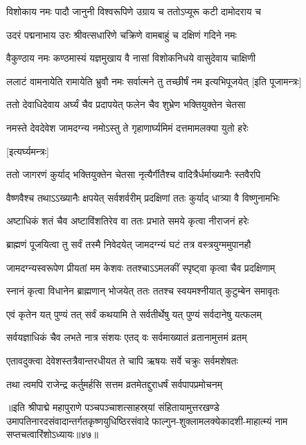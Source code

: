 \twolineshloka
{विशोकाय नमः पादौ जानुनी विश्वरूपिणे}
{उग्राय च ततोऽप्यूरू कटी दामोदराय च}%

\twolineshloka
{उदरं पद्मनाभाय उरः श्रीवत्सधारिणे}
{चक्रिणे वामबाहुं च दक्षिणं गदिने नमः}%

\twolineshloka
{वैकुण्ठाय नमः कण्ठमास्यं यज्ञमुखाय वै}
{नासां विशोकनिधये वासुदेवाय चाक्षिणी}%

\twolineshloka
{ललाटं वामनायेति रामायेति भ्रुवौ नमः}
{सर्वात्मने तु तच्छीर्षं नम इत्यभिपूजयेत्}%
[इति पूजामन्त्रः]

\twolineshloka
{ततो देवाधिदेवाय अर्घ्यं चैव प्रदापयेत्}
{फलेन चैव शुभ्रेण भक्तियुक्तेन चेतसा}%

\twolineshloka
{नमस्ते देवदेवेश जामदग्न्य नमोऽस्तु ते}
{गृहाणार्घ्यमिमं दत्तमामलक्या युतो हरेः}

[इत्यर्घ्यमन्त्रः]

\twolineshloka
{ततो जागरणं कुर्याद् भक्तियुक्तेन चेतसा}
{नृत्यैर्गीतैश्च वादित्रैर्धर्माख्यानैः स्तवैरपि}%

\twolineshloka
{वैष्णवैश्च तथाऽऽख्यानैः क्षपयेत् सर्वशर्वरीम्}
{प्रदक्षिणां ततः कुर्याद् धात्र्या वै विष्णुनामभिः}%

\twolineshloka
{अष्टाधिकं शतं चैव अष्टाविंशतिरेव वा}
{ततः प्रभाते समये कृत्वा नीराजनं हरेः}%

\twolineshloka
{ब्राह्मणं पूजयित्वा तु सर्वं तस्मै निवेदयेत्}
{जामदग्न्यं घटं तत्र वस्त्रयुग्ममुपानहौ}%

\twolineshloka
{जामदग्न्यस्वरूपेण प्रीयतां मम केशवः}
{ततश्चाऽऽमलकीं स्पृष्ट्वा कृत्वा चैव प्रदक्षिणाम्}%

\twolineshloka
{स्नानं कृत्वा विधानेन ब्राह्मणान् भोजयेत् ततः}
{ततश्च स्वयमश्नीयात् कुटुम्बेन समावृतः}%

\twolineshloka
{एवं कृतेन यत् पुण्यं तत् सर्वं कथयामि ते}
{सर्वतीर्थेषु यत् पुण्यं सर्वदानेषु यत्फलम्}%

\twolineshloka
{सर्वयज्ञाधिकं चैव लभते नात्र संशयः}
{एतद् वः सर्वमाख्यातं व्रतानामुत्तमं व्रतम्}%

\twolineshloka
{एतावदुक्त्वा देवेशस्तत्रैवान्तरधीयत}
{ते चापि ऋषयः सर्वे चक्रुः सर्वमशेषतः}%

\twolineshloka
{तथा त्वमपि राजेन्द्र कर्तुमर्हसि सत्तम}
{व्रतमेतद्दुराधर्षं सर्वपापप्रमोचनम्}%

॥इति श्रीपाद्मे महापुराणे पञ्चपञ्चाशत्साहस्र्यां संहितायामुत्तरखण्डे उमापतिनारदसंवादान्तर्गतकृष्णयुधिष्ठिरसंवादे फाल्गुन-शुक्लामलक्येकादशी-माहात्म्यं नाम सप्तचत्वारिंशोऽध्यायः॥४७॥

\genMangalaShloka

\hyperref[sec:ekadashi_mahatmyam_padma_puranam]{\closesub}
\clearpage

